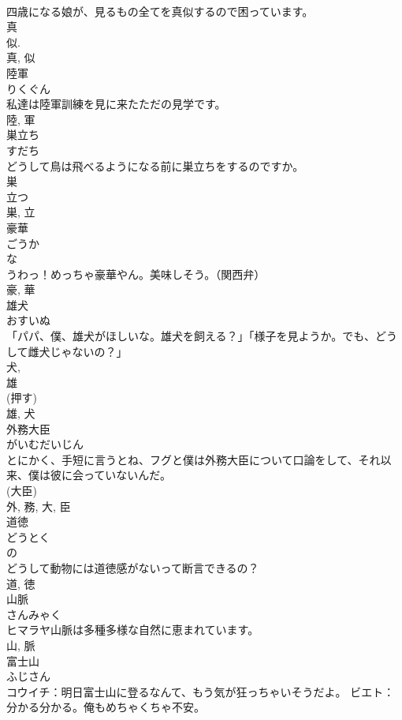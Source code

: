 \documentclass[8pt]{extreport}
\begin{document}
\begin{CJK}{UTF8}{min}
\\	四歳になる娘が、見るもの全てを真似するので困っています。	
\\	真 
\\	似. 
\\	真, 似	
\\	陸軍	
\\	りくぐん	
\\	私達は陸軍訓練を見に来たただの見学です。	
\\	陸, 軍	
\\	巣立ち	
\\	すだち	
\\	どうして鳥は飛べるようになる前に巣立ちをするのですか。	
\\	巣 
\\	立つ 
\\	巣, 立	
\\	豪華	
\\	ごうか	
\\	な 
\\	うわっ！めっちゃ豪華やん。美味しそう。（関西弁）	
\\	豪, 華	
\\	雄犬	
\\	おすいぬ	
\\	「パパ、僕、雄犬がほしいな。雄犬を飼える？」「様子を見ようか。でも、どうして雌犬じゃないの？」	
\\	犬, 
\\	雄 
\\	(押す) 
\\	雄, 犬	
\\	外務大臣	
\\	がいむだいじん	
\\	とにかく、手短に言うとね、フグと僕は外務大臣について口論をして、それ以来、僕は彼に会っていないんだ。	
\\	(大臣) 
\\	外, 務, 大, 臣	
\\	道徳	
\\	どうとく	
\\	の 
\\	どうして動物には道徳感がないって断言できるの？	
\\	道, 徳	
\\	山脈	
\\	さんみゃく	
\\	ヒマラヤ山脈は多種多様な自然に恵まれています。	
\\	山, 脈	
\\	富士山	
\\	ふじさん	
\\	コウイチ：明日富士山に登るなんて、もう気が狂っちゃいそうだよ。 ビエト：分かる分かる。俺もめちゃくちゃ不安。	

\end{CJK}
\end{document}
